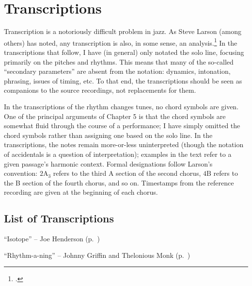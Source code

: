 \doublespacing
\chapter{Transcriptions}
\singlespacing

Transcription is a notoriously difficult problem in jazz. As Steve Larson
(among others) has noted, any transcription is also, in some sense, an
analysis.\footcite[2]{larson:2009} In the transcriptions that follow, I have
(in general) only notated the solo line, focusing primarily on the pitches and
rhythms. This means that many of the so-called ``secondary parameters'' are
absent from the notation: dynamics, intonation, phrasing, issues of timing,
etc. To that end, the transcriptions should be seen as companions to the
source recordings, not replacements for them.

In the transcriptions of the rhythm changes tunes, no chord symbols are given.
One of the principal arguments of Chapter 5 is that the chord symbols are
somewhat fluid through the course of a performance; I have simply omitted the
chord symbols rather than assigning one based on the solo line. In the
transcriptions, the notes remain more-or-less uninterpreted (though the
notation of accidentals is a question of interpretation); examples in the text
refer to a given passage's harmonic context. Formal designations follow
Larson's convention: $2\mathrm{A}_3$ refers to the third A section of the
second chorus, $4\mathrm{B}$ refers to the B section of the fourth chorus, and
so on. Timestamps from the reference recording are given at the beginning of
each chorus.

\section*{List of Transcriptions}

\begin{compactitem}
    \item ``Isotope'' -- Joe Henderson (p.~\pageref{transcription:isotope})
    \item ``Rhythm-a-ning'' -- Johnny Griffin and Thelonious Monk
      (p.~\pageref{transcription:rhythm-a-ning})
\end{compactitem}
\nocite{henderson:isotope,monk:action}

\newpage

{}
\label{transcription:isotope}


{}
\label{transcription:rhythm-a-ning}


